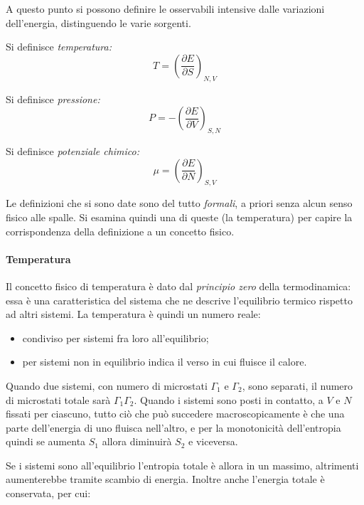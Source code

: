 A questo punto si possono definire le osservabili intensive dalle variazioni dell'energia, distinguendo le varie sorgenti.

\begin{defn}
	\label{def:ossint}
	Si definisce \textit{temperatura:}
	\begin{equation*}
	T = \left(\frac{\partial E}{\partial S}\right)_{N,V}
	\end{equation*}
	
	Si definisce \textit{pressione:}
	\begin{equation*}
	P = - \left(\frac{\partial E}{\partial V}\right)_{S,N}
	\end{equation*}
	
	Si definisce \textit{potenziale chimico:}
	\begin{equation*}
	\mu = \left(\frac{\partial E}{\partial N}\right)_{S,V}
	\end{equation*}
\end{defn}

Le definizioni che si sono date sono del tutto \textit{formali}, a priori senza alcun senso fisico alle spalle. Si esamina quindi una di queste (la temperatura) per capire la corrispondenza della definizione a un concetto fisico.

\paragraph{Temperatura} Il concetto fisico di temperatura è dato dal \textit{principio zero} della termodinamica: essa è una caratteristica del sistema che ne descrive l'equilibrio termico rispetto ad altri sistemi. La temperatura è quindi un numero reale:
\begin{itemize}
	\item condiviso per sistemi fra loro all'equilibrio;
	\item per sistemi non in equilibrio indica il verso in cui fluisce il calore.
\end{itemize}

Quando due sistemi, con numero di microstati $\Gamma_1$ e $\Gamma_2$, sono separati, il numero di microstati totale sarà $\Gamma_1\Gamma_2$.
Quando i sistemi sono posti in contatto, a $V$ e $N$ fissati per ciascuno, tutto ciò che può succedere macroscopicamente è che una parte dell'energia di uno fluisca nell'altro, e per la monotonicità dell'entropia quindi se aumenta $S_1$ allora diminuirà $S_2$ e viceversa.

Se i sistemi sono all'equilibrio l'entropia totale è allora in un massimo, altrimenti aumenterebbe tramite scambio di energia. Inoltre anche l'energia totale è conservata, per cui:

